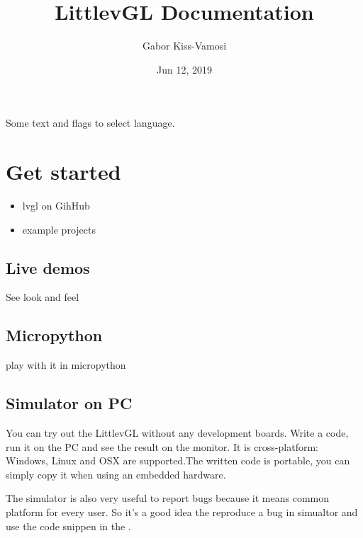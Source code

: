 \documentclass[letterpaper,10pt,english]{sphinxmanual}
\title{LittlevGL Documentation}
\date{Jun 12, 2019}
\author{Gabor Kiss-Vamosi}
\begin{document}
\maketitle
\sphinxtableofcontents
{}\label{\detokenize{index::doc}}


Some text and flags to select language.


\chapter{Get started}
\label{\detokenize{get-started/index::doc}}\label{\detokenize{get-started/index:get-started}}\label{\detokenize{get-started/index:welcome-to-littlevgl-s-documentation}}\begin{itemize}
\item {} 
lvgl on GihHub

\item {} 
example projects

\end{itemize}


\section{Live demos}
\label{\detokenize{get-started/live-demo::doc}}\label{\detokenize{get-started/live-demo:live-demos}}
See look and feel


\section{Micropython}
\label{\detokenize{get-started/micropython::doc}}\label{\detokenize{get-started/micropython:micropython}}
play with it in micropython


\section{Simulator on PC}
\label{\detokenize{get-started/pc-simulator::doc}}\label{\detokenize{get-started/pc-simulator:simulator-on-pc}}
You can try out the LittlevGL  without any development boards. Write a code, run it on the PC and see the result on the monitor. It is cross-platform: Windows, Linux and OSX are supported.The written code is portable, you can simply copy it when using an embedded hardware.

The simulator is also very useful to report bugs because it means common platform for every user. So it’s a good idea the reproduce a bug in simualtor and use the code snippen in the .
\end{document}
